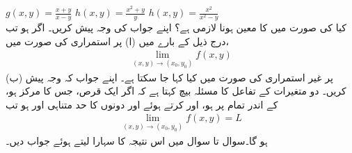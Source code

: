 $g(x,y)=\frac{x+y}{x-y}$
$h(x,y)=\frac{x^2+y}{y}$
$h(x,y)=\frac{x^2}{x^2-y}$
\\
کیا   کی صورت میں  کا معین ہونا لازمی ہے؟ اپنے جواب کی وجہ پیش کریں۔
اگر  ہو تب درج ذیل کے بارے میں  (ا)    پر استمراری  کی صورت میں،
\begin{align*}
\lim_{(x,y)\to(x_0,y_0)} f(x,y)
\end{align*}
(ب)   پر غیر استمراری  کی صورت میں کیا کہا جا  سکتا ہے۔ اپنے جواب کہ وجہ پیش کریں۔
دو متغیرات کے تفاعل کا مسئلہ بیچ  کہتا ہے کہ اگر ایک قرص، جس کا  مرکز   ہو، کے اندر تمام  پر  ہو،  اور  کرتے ہوئے   اور  دونوں کا  حد  متناہی اور  ہو   تب
\begin{align*}
\lim_{(x,y)\to(x_0,y_0)}f(x,y)=L
\end{align*}
ہو گا۔سوال  تا سوال  میں  اس نتیجہ  کا سہارا لیتے ہوئے جواب دیں۔ 

